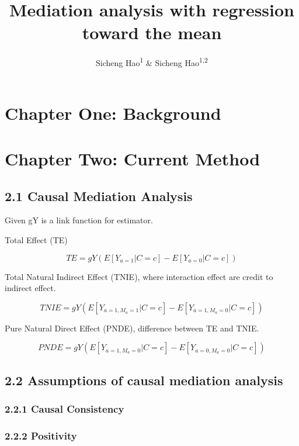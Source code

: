 \documentclass[
  english,
  man]{apa6}
\title{Mediation analysis with regression toward the mean}
\author{Sicheng Hao\textsuperscript{1} \& Sicheng Hao\textsuperscript{1,2}}
\date{}
\affiliation{\vspace{0.5cm}\textsuperscript{1} Northeastern University\\\textsuperscript{2} Mass General Brigham}
\begin{document}
\maketitle

\hypertarget{chapter-one-background}{%
\section{Chapter One: Background}\label{chapter-one-background}}

\hypertarget{chapter-two-current-method}{%
\section{Chapter Two: Current Method}\label{chapter-two-current-method}}

\hypertarget{causal-mediation-analysis}{%
\subsection{2.1 Causal Mediation Analysis}\label{causal-mediation-analysis}}

Given gY is a link function for estimator.

Total Effect (TE)

\[TE = gY(E[Y_{a = 1} | C = c] - E[Y_{a = 0} | C = c] )\]

Total Natural Indirect Effect (TNIE), where interaction effect are credit to indirect effect.

\[TNIE = gY(E[Y_{a = 1,M_a = 1} | C = c] - E[Y_{a = 1,M_a = 0} | C = c] )\]

Pure Natural Direct Effect (PNDE), difference between TE and TNIE.

\[PNDE = gY(E[Y_{a = 1,M_a = 0} | C = c] - E[Y_{a = 0,M_a = 0} | C = c] )\]

\hypertarget{assumptions-of-causal-mediation-analysis}{%
\subsection{2.2 Assumptions of causal mediation analysis}\label{assumptions-of-causal-mediation-analysis}}

\hypertarget{causal-consistency}{%
\subsubsection{2.2.1 Causal Consistency}\label{causal-consistency}}

\hypertarget{positivity}{%
\subsubsection{2.2.2 Positivity}\label{positivity}}
\end{document}

